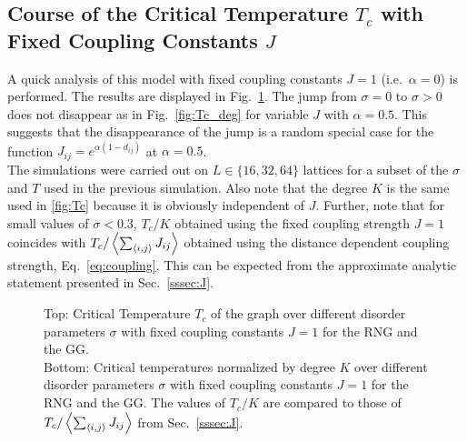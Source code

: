     \subsection{Course of the Critical Temperature $T_c$ with Fixed Coupling Constants $J$}
    \label{appendix:fixedCoupling}
        A quick analysis of this model with fixed coupling constants \(J = 1\)
        (i.e.\ \(\alpha=0\)) is performed. The results are displayed in Fig.\ \ref{fig:Tc_deg_A0}.
        The jump from \(\sigma=0\) to \(\sigma>0\) does not disappear as in Fig.\ \ref{fig:Tc_deg}
        for variable \(J\) with \(\alpha=0.5\). This suggests that the
        disappearance of the jump is a random special case for the function
        \(J_{ij}=e^{\alpha(1-d_{ij})}\) at \(\alpha=0.5\).\\
        The simulations were carried out on \(L \in \{16,32,64\}\) lattices
        for a subset of the \(\sigma\) and \(T\) used in the previous simulation.
        Also note that the degree \(K\) is
        the same used in \ref{fig:Tc}
        because it is obviously independent of \(J\).
        Further, note that for small values of \(\sigma < 0.3\), \(T_c / K\)
        obtained using the fixed coupling strength \(J=1\) coincides with
        \(T_c / \left< \sum_{\left< i,j \right>}J_{ij} \right>\) obtained using the distance
        dependent coupling strength, Eq.\ \ref{eq:coupling}.
        This can be expected from the approximate analytic statement presented
        in Sec.\ \ref{sssec:J}.
        \begin{figure}[htbp]
            \centering


            \caption[Critical Temperature and Critical Temperature Normalized by Degree of the Graph for Fixed Coupling Constants $J=1$]
            {
                Top: Critical Temperature \(T_c\) of the graph over different
                disorder parameters \(\sigma\) with fixed coupling constants \(J=1\) for
                 the RNG and
                 the GG.\\
                Bottom: Critical temperatures normalized by degree \(K\) over
                different disorder parameters \(\sigma\) with fixed coupling constants \(J=1\) for
                 the RNG and
                 the GG. The values of \(T_c / K\)
                are compared to those of \(T_c /  \left< \sum_{\left< i,j \right>}J_{ij} \right>\)
                from Sec.\ \ref{sssec:J}.
            }
            \label{fig:Tc_deg_A0}
        \end{figure}\\
